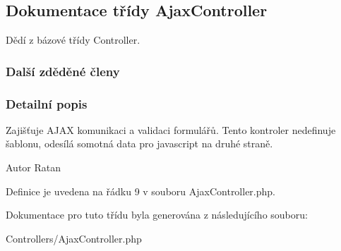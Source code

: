 \hypertarget{class_ajax_controller}{\subsection{Dokumentace třídy Ajax\-Controller}
\label{class_ajax_controller}
}


Dědí z bázové třídy Controller.

\subsubsection*{Další zděděné členy}


\subsubsection{Detailní popis}
Zajišťuje A\-J\-A\-X komunikaci a validaci formulářů. Tento kontroler nedefinuje šablonu, odesílá somotná data pro javascript na druhé straně. \begin{DoxyAuthor}{Autor}
Ratan 
\end{DoxyAuthor}


Definice je uvedena na řádku 9 v souboru Ajax\-Controller.\-php.



Dokumentace pro tuto třídu byla generována z následujícího souboru\-:\begin{DoxyCompactItemize}
\item 
Controllers/Ajax\-Controller.\-php\end{DoxyCompactItemize}
